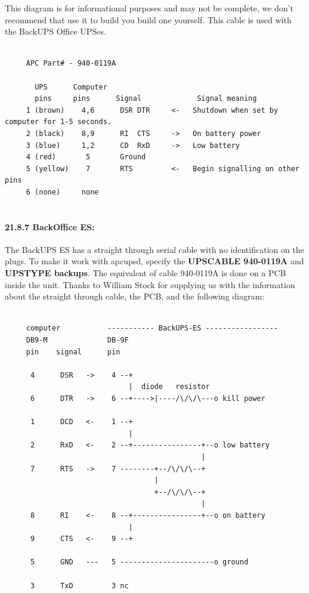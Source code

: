 \label{index-Cables-208}
This diagram is for informational purposes and may not be complete, we don't
recommend that use it to build you build one yourself. This cable is used with
the BackUPS Office UPSes. 

\footnotesize
\begin{verbatim}
     
     APC Part# - 940-0119A
     
       UPS      Computer
       pins     pins      Signal             Signal meaning
     1 (brown)    4,6      DSR DTR     <-   Shutdown when set by computer for 1-5 seconds.
     2 (black)    8,9      RI  CTS     ->   On battery power
     3 (blue)     1,2      CD  RxD     ->   Low battery
     4 (red)       5       Ground
     5 (yellow)    7       RTS         <-   Begin signalling on other pins
     6 (none)     none
     
\end{verbatim}
\normalsize

\label{BackOffice-ES}

\paragraph*{21.8.7 BackOffice ES:}

\label{index-Cables-209}
\label{index-BackOffice-ES-210}
The BackUPS ES has a straight through serial cable with no identification on
the plugs. To make it work with apcupsd, specify the {\bf UPSCABLE 940-0119A}
and {\bf UPSTYPE backups}.  The equivalent of cable 940-0119A is done on a PCB
inside the unit.  Thanks to William Stock for supplying us with the
information about the straight through cable, the PCB, and the following
diagram: 

\footnotesize
\begin{verbatim}
     
     computer           ----------- BackUPS-ES -----------------
     DB9-M              DB-9F
     pin    signal      pin
     
      4      DSR   ->    4 --+
                             |  diode   resistor
      6      DTR   ->    6 --+---->|----/\/\/\---o kill power
     
      1      DCD   <-    1 --+
                             |
      2      RxD   <-    2 --+----------------+--o low battery
                                              |
      7      RTS   ->    7 --------+--/\/\/\--+
                                   |
                                   +--/\/\/\--+
                                              |
      8      RI    <-    8 --+----------------+--o on battery
                             |
      9      CTS   <-    9 --+
     
      5      GND   ---   5 ----------------------o ground
     
      3      TxD         3 nc
     
\end{verbatim}
\normalsize

